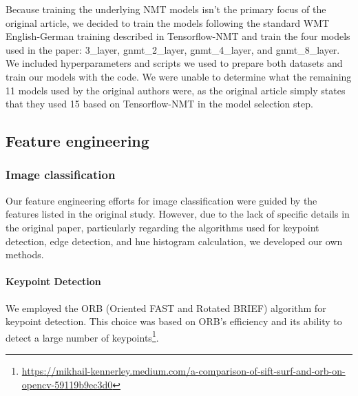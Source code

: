 Because training the underlying NMT models isn't the primary focus of the original article, we decided to train the models following the standard WMT English-German training described in Tensorflow-NMT and train the four models used in the paper: 3\_layer, gnmt\_2\_layer, gnmt\_4\_layer, and gnmt\_8\_layer. We included hyperparameters and scripts we used to prepare both datasets and train our models with the code. We were unable to determine what the remaining 11 models used by the original authors were, as the original article simply states that they used 15  based on Tensorflow-NMT in the model selection step.




\subsection{Feature engineering}
\subsubsection{Image classification}

Our feature engineering efforts for image classification were guided by the features listed in the original study. However, due to the lack of specific details in the original paper, particularly regarding the algorithms used for keypoint detection, edge detection, and hue histogram calculation, we developed our own methods.

\paragraph{Keypoint Detection}
We employed the ORB (Oriented FAST and Rotated BRIEF) algorithm\supercite{Rublee2011ORBAE} for keypoint detection. This choice was based on ORB's efficiency and its ability to detect a large number of keypoints\footnote{\url{https://mikhail-kennerley.medium.com/a-comparison-of-sift-surf-and-orb-on-opencv-59119b9ec3d0}}.

